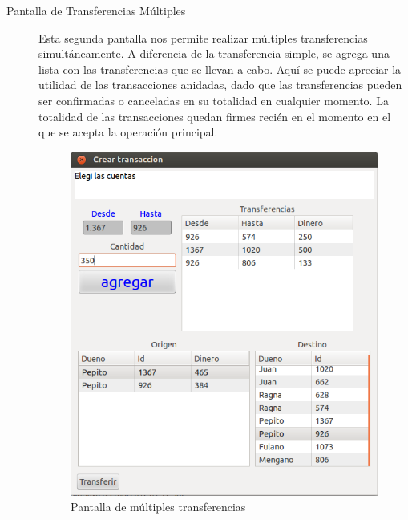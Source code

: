 \begin{description}
		
	\item[Pantalla de Transferencias Múltiples]
		Esta segunda pantalla nos permite realizar múltiples transferencias
		simultáneamente.
		A diferencia de la transferencia simple, se agrega una
		lista con las transferencias que se llevan a cabo.
		Aquí se puede apreciar la utilidad de las transacciones anidadas, dado que
		las transferencias pueden ser confirmadas o canceladas en su totalidad en
		cualquier momento. 
		La totalidad de las transacciones quedan firmes recién en el momento en el 
		que se acepta la operación principal.
	
		\begin{figure}[h]
			\centering
			\includegraphics[scale=0.5]{img/multTransferencias}
			\caption{Pantalla de múltiples transferencias }
			\label{trasferenciaMultiple}
		\end{figure}
		
\end{description}